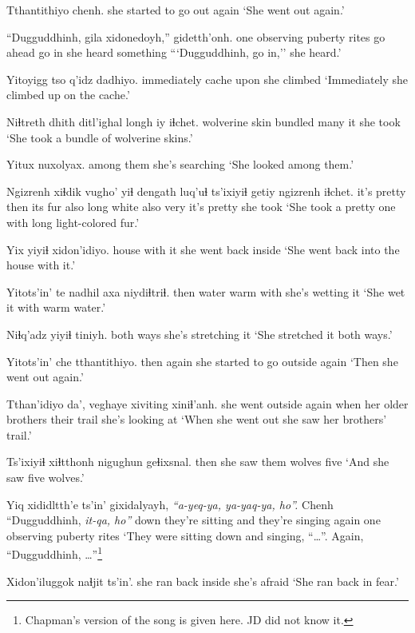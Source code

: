 \documentclass[12pt]{article}
\begin{document}
\gll Tthantithiyo chenh.
{she started to go out} again
\glt `She went out again.'
\glend

\gll ``Dugguddhinh, gila xidonedoyh,'' gidetth'onh.
{one observing puberty rites} {go ahead} {go in}  {she heard something}
\glt ```Dugguddhinh, go in,'' she heard.'
\glend

\gll Yitoyigg tso q'idz dadhiyo.
immediately cache upon {she climbed}
\glt `Immediately she climbed up on the cache.'
\glend

\gll Niɬtreth dhith ditl'ighal longh iy iɬchet.
wolverine skin bundled many it {she took}
\glt `She took a bundle of wolverine skins.'
\glend

\gll Yitux  nuxolyax.
{among them} {she's searching}
\glt `She looked among them.'
\glend

\gll Ngizrenh xiɬdik vugho' yiɬ dengath luq'uɬ ts'ixiyiɬ getiy ngizrenh iɬchet.
{it's pretty} then {its fur} also long  white also  very {it's pretty} {she took}
\glt `She took a pretty one with long light-colored fur.'
\glend

\gll Yix yiyiɬ xidon'idiyo.
house {with it} {she went back inside}
\glt `She went back into the house with it.'
\glend

\gll Yitots'in' te nadhil axa niydiɬtriɬ.
then  water warm  with {she's wetting it} 
\glt `She wet it with warm water.'
\glend

\gll Niɬq'adz {yiyiɬ tiniyh.}
{both ways} {she's stretching it}
\glt `She stretched it both ways.'
\glend

\gll Yitots'in' che tthantithiyo.
then  again {she started to go outside again}
\glt `Then she went out again.'
\glend

\gll Tthan'idiyo  da', veghaye xiviting xiniɬ'anh.
{she went outside again} when {her older brothers} {their trail} {she's looking at}
\glt `When she went out she saw her brothers' trail.'
\glend

\gll Ts'ixiyiɬ xiɬtthonh nigughun geɬixsnal.
then  {she saw them} wolves  five
\glt `And she saw five wolves.'
\glend

\gll Yiq xididltth'e  ts'in' gixidalyayh, {\em ``a-yeq-ya, ya-yaq-ya, ho''.} Chenh ``Dugguddhinh, {\em it-qa, ho''}
down {they're sitting} and {they're singing} {} again  {one observing puberty rites}   {}
\glt `They were sitting down and singing, ``\ldots''. Again, ``Dugguddhinh, \ldots''\footnote{Chapman's version of the song is given here. JD did not know it.}
\glend

\gll Xidon'iluggok naɬjit ts'in'.
{she ran back inside} {she's afraid} {}
\glt `She ran back in fear.'
\glend
\end{document}
